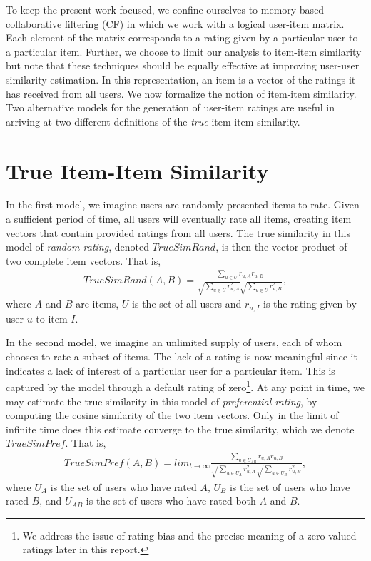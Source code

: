 \documentclass[11pt]{article}
\begin{document}
To keep the present work focused, we confine ourselves to memory-based
collaborative filtering (CF) in which we work with a logical user-item matrix.
Each element of the matrix corresponds to a rating given by a particular user to
a particular item. Further, we choose to limit our analysis to item-item
similarity but note that these techniques should be equally effective at
improving user-user similarity estimation. In this representation, an item is a
vector of the ratings it has received from all users. We now formalize the
notion of item-item similarity. Two alternative models for the generation of
user-item ratings are useful in arriving at two different definitions of the
{\em true} item-item similarity.

\section*{True Item-Item Similarity}

In the first model, we imagine users are randomly presented items to rate. Given
a sufficient period of time, all users will eventually rate all items, creating
item vectors that contain provided ratings from all users. The true similarity
in this model of {\em random rating}, denoted $TrueSimRand$, is then the vector
product of two complete item vectors. That is,
\begin{align}
TrueSimRand(A, B) = \frac{\sum\limits_{u\in U}
r_{u,A}r_{u,B}}{\sqrt{\sum\limits_{u\in U} r_{u,A}^2}
\sqrt{\sum\limits_{u\in U} r_{u,B}^2}},
\end{align}
where $A$ and $B$ are items, $U$ is the set of all users and $r_{u,I}$ is the 
rating given by user $u$ to item $I$.

In the second model, we imagine an unlimited supply of users, each of whom
chooses to rate a subset of items. The lack of a rating is now meaningful since
it indicates a lack of interest of a particular user for a particular item. This
is captured by the model through a default rating of zero\footnote{We address
the issue of rating bias and the precise meaning of a zero valued ratings later
in this report.}. At any point in time, we may estimate the true similarity in
this model of {\em preferential rating}, by computing the cosine similarity of
the two item vectors. Only in the limit of infinite time does this estimate
converge to the true similarity, which we denote $TrueSimPref$.  That is,
\begin{align}
TrueSimPref(A, B) = lim_{t\to\infty}\frac{\sum\limits_{u\in U_{AB}}
r_{u,A}r_{u,B}}{\sqrt{\sum\limits_{u\in U_A} r_{u,A}^2}
\sqrt{\sum\limits_{u\in U_B} r_{u,B}^2}},
\end{align}
where $U_A$ is the set of users who have rated $A$, $U_B$ is the set of users
who have rated $B$, and $U_{AB}$ is the set of users who have rated both $A$ and
$B$.
\end{document}
